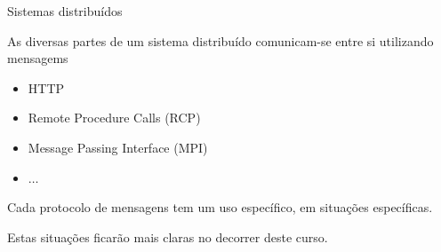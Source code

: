 \documentclass[compress]{beamer}
\begin{document}
\begin{frame}{Sistemas distribuídos}

As diversas partes de um sistema distribuído comunicam-se entre si utilizando mensagems
\begin{itemize}
    \item HTTP
    \item Remote Procedure Calls (RCP)
    \item Message Passing Interface (MPI)
    \item $\ldots$
\end{itemize}

\vspace{0.5cm}

Cada protocolo de mensagens tem um uso específico, em situações específicas.

Estas situações ficarão mais claras no decorrer deste curso.

\end{frame}


\end{document}
